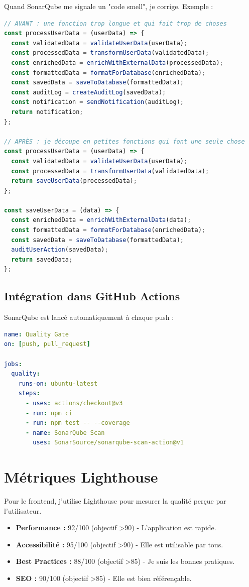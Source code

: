 Quand SonarQube me signale un "code smell", je corrige. Exemple :

\begin{lstlisting}[language=JavaScript]
// AVANT : une fonction trop longue et qui fait trop de choses
const processUserData = (userData) => {
  const validatedData = validateUserData(userData);
  const processedData = transformUserData(validatedData);
  const enrichedData = enrichWithExternalData(processedData);
  const formattedData = formatForDatabase(enrichedData);
  const savedData = saveToDatabase(formattedData);
  const auditLog = createAuditLog(savedData);
  const notification = sendNotification(auditLog);
  return notification;
};

// APRÈS : je découpe en petites fonctions qui font une seule chose
const processUserData = (userData) => {
  const validatedData = validateUserData(userData);
  const processedData = transformUserData(validatedData);
  return saveUserData(processedData);
};

const saveUserData = (data) => {
  const enrichedData = enrichWithExternalData(data);
  const formattedData = formatForDatabase(enrichedData);
  const savedData = saveToDatabase(formattedData);
  auditUserAction(savedData);
  return savedData;
};
\end{lstlisting}

\subsection{Intégration dans GitHub Actions}

SonarQube est lancé automatiquement à chaque push :

\begin{lstlisting}[language=yaml]
name: Quality Gate
on: [push, pull_request]

jobs:
  quality:
    runs-on: ubuntu-latest
    steps:
      - uses: actions/checkout@v3
      - run: npm ci
      - run: npm test -- --coverage
      - name: SonarQube Scan
        uses: SonarSource/sonarqube-scan-action@v1
\end{lstlisting}

\section{Métriques Lighthouse}

Pour le frontend, j'utilise Lighthouse pour mesurer la qualité perçue par l'utilisateur.

\begin{itemize}
    \item \textbf{Performance :} 92/100 (objectif >90) - L'application est rapide.
    \item \textbf{Accessibilité :} 95/100 (objectif >90) - Elle est utilisable par tous.
    \item \textbf{Best Practices :} 88/100 (objectif >85) - Je suis les bonnes pratiques.
    \item \textbf{SEO :} 90/100 (objectif >85) - Elle est bien référençable.
\end{itemize}

